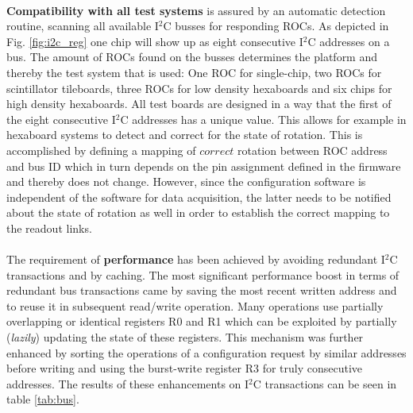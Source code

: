 \documentclass[../../main.tex]{subfiles}
\begin{document}
\\
\textbf{Compatibility with all test systems} is assured by an automatic detection routine, scanning all available I$^2$C busses for responding ROCs. As depicted in Fig. \ref{fig:i2c_reg} one chip will show up as eight consecutive I$^2$C addresses on a bus. The amount of ROCs found on the busses determines the platform and thereby the test system that is used: One ROC for single-chip, two ROCs for scintillator tileboards, three ROCs for low density hexaboards and six chips for high density hexaboards. All test boards are designed in a way that the first of the eight consecutive I$^2$C addresses has a unique value. This allows for example in hexaboard systems to detect and correct for the state of rotation. This is accomplished by defining a mapping of $correct$ rotation between ROC address and bus ID which in turn depends on the pin assignment defined in the firmware and thereby does not change. However, since the configuration software is independent of the software for data acquisition, the latter needs to be notified about the state of rotation as well in order to establish the correct mapping to the readout links.\\
\\
The requirement of \textbf{performance} has been achieved by avoiding redundant I$^2$C transactions and by caching. The most significant performance boost in terms of redundant bus transactions came by saving the most recent written address and to reuse it in subsequent read/write operation. Many operations use partially overlapping or identical registers R0 and R1 which can be exploited by partially (\textit{lazily}) updating the state of these registers. This mechanism was further enhanced by sorting the operations of a configuration request by similar addresses before writing and using the burst-write register R3 for truly consecutive addresses. The results of these enhancements on I$^2$C transactions can be seen in table \ref{tab:bus}.
\end{document}
